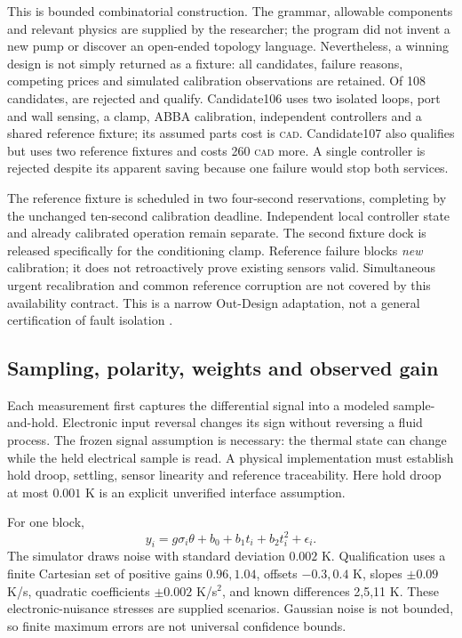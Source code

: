 \documentclass[11pt,letterpaper]{article}
\newcommand{\CAD}{\textsc{cad}}
\begin{document}
This is bounded combinatorial construction. The grammar, allowable components and relevant physics are supplied by the researcher; the program did not invent a new pump or discover an open-ended topology language. Nevertheless, a winning design is not simply returned as a fixture: all candidates, failure reasons, competing prices and simulated calibration observations are retained. Of 108 candidates, \RejectedCount{} are rejected and \QualifiedCount{} qualify. Candidate106 uses two isolated loops, port and wall sensing, a clamp, ABBA calibration, independent controllers and a shared reference fixture; its assumed parts cost is \PartsCost{} \CAD. Candidate107 also qualifies but uses two reference fixtures and costs 260 \CAD{} more. A single controller is rejected despite its apparent saving because one failure would stop both services.

The reference fixture is scheduled in two four-second reservations, completing by the unchanged ten-second calibration deadline. Independent local controller state and already calibrated operation remain separate. The second fixture dock is released specifically for the conditioning clamp. Reference failure blocks \emph{new} calibration; it does not retroactively prove existing sensors valid. Simultaneous urgent recalibration and common reference corruption are not covered by this availability contract. This is a narrow Out-Design adaptation, not a general certification of fault isolation \cite[p.5]{outdesign}.

\subsection{Sampling, polarity, weights and observed gain}
Each measurement first captures the differential signal into a modeled sample-and-hold. Electronic input reversal changes its sign without reversing a fluid process. The frozen signal assumption is necessary: the thermal state can change while the held electrical sample is read. A physical implementation must establish hold droop, settling, sensor linearity and reference traceability. Here hold droop at most $0.001$ K is an explicit unverified interface assumption.

For one block,
\begin{equation}
y_i=g\sigma_i\theta+b_0+b_1t_i+b_2t_i^2+\epsilon_i.
\label{eq:calibration}
\end{equation}
The simulator draws noise with standard deviation $0.002$ K. Qualification uses a finite Cartesian set of positive gains $0.96,1.04$, offsets $-0.3,0.4$ K, slopes $\pm0.09$ K/s, quadratic coefficients $\pm0.002$ K/s$^2$, and known differences 2,5,11 K. These electronic-nuisance stresses are supplied scenarios. Gaussian noise is not bounded, so finite maximum errors are not universal confidence bounds.
\end{document}
